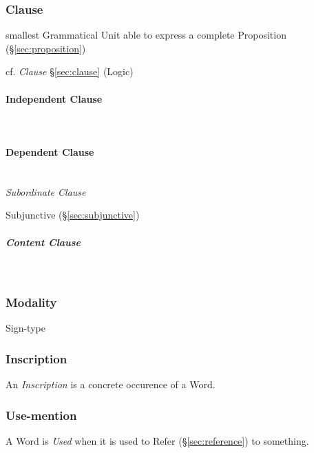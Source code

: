 \subsubsection{Clause}\label{sec:grammatical_clause}

smallest Grammatical Unit able to express a complete Proposition
(\S\ref{sec:proposition})

cf. \emph{Clause} \S\ref{sec:clause} (Logic)



\paragraph{Independent Clause}\label{sec:independent_clause}\hfill \\



\paragraph{Dependent Clause}\label{sec:dependent_clause}\hfill \\

\emph{Subordinate Clause}

Subjunctive (\S\ref{sec:subjunctive})

\subparagraph{Content Clause}\label{sec:content_clause}\hfill \\



\subsubsection{Modality}\label{sec:modality}

Sign-type



\subsubsection{Inscription}\label{sec:inscription}

An \emph{Inscription} is a concrete occurence of a Word.



\subsubsection{Use-mention}\label{sec:use_mention}

A Word is \emph{Used} when it is used to Refer (\S\ref{sec:reference})
to something.

